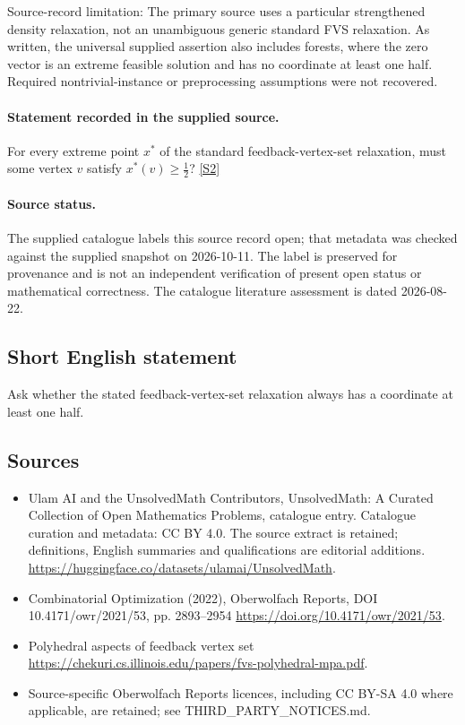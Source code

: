\documentclass[11pt]{article}
\begin{document}
Source-record limitation: The primary source uses a particular strengthened density relaxation, not an unambiguous generic standard FVS relaxation. As written, the universal supplied assertion also includes forests, where the zero vector is an extreme feasible solution and has no coordinate at least one half. Required nontrivial-instance or preprocessing assumptions were not recovered.
\paragraph{Statement recorded in the supplied source.}
For every extreme point $x^*$ of the standard feedback-vertex-set relaxation, must some vertex $v$ satisfy $x^*(v)\geq\tfrac12$? \href{https://doi.org/10.4171/owr/2021/53}{[S2]}
\paragraph{Source status.}
The supplied catalogue labels this source record open; that metadata was checked against the supplied snapshot on 2026-10-11. The label is preserved for provenance and is not an independent verification of present open status or mathematical correctness. The catalogue literature assessment is dated 2026-08-22.
\subsection{Short English statement}
Ask whether the stated feedback-vertex-set relaxation always has a coordinate at least one half.
\subsection{Sources}
\begin{itemize}
\item[S1] Ulam AI and the UnsolvedMath Contributors, UnsolvedMath: A Curated Collection of Open Mathematics Problems, catalogue entry. Catalogue curation and metadata: CC BY 4.0. The source extract is retained; definitions, English summaries and qualifications are editorial additions.
\url{https://huggingface.co/datasets/ulamai/UnsolvedMath}.
\item[S2] Combinatorial Optimization (2022), Oberwolfach Reports, DOI 10.4171/owr/2021/53, pp. 2893--2954
\url{https://doi.org/10.4171/owr/2021/53}.
\item[S3] Polyhedral aspects of feedback vertex set
\url{https://chekuri.cs.illinois.edu/papers/fvs-polyhedral-mpa.pdf}.
\item Source-specific Oberwolfach Reports licences, including CC BY-SA 4.0 where applicable, are retained; see THIRD\_PARTY\_NOTICES.md.
\end{itemize}
\end{document}
